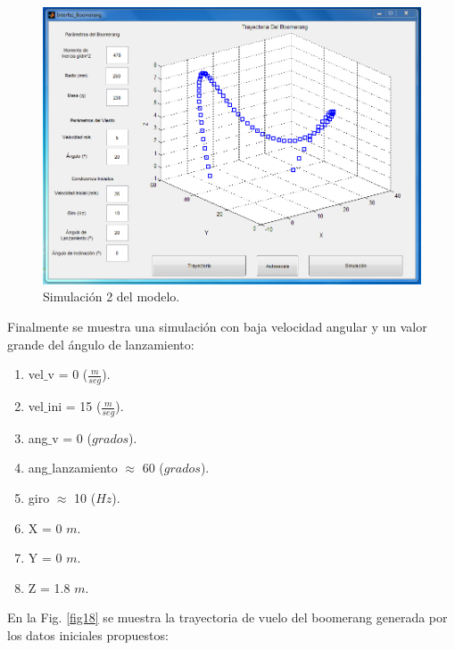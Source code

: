 		\begin{figure}[h]
		\begin{center}
		\includegraphics[scale=0.45]{imagenes/3-boomerang/tray_2.png}
		\caption{Simulación 2 del modelo.}
		\label{fig17}
		\end{center}
		\end{figure}

	Finalmente se muestra una simulación con baja velocidad angular y un valor grande del ángulo de lanzamiento:

		\begin{enumerate}
		\item{vel$\_$v = 0 {($\frac{m}{seg}$)}.}
		\item{vel$\_$ini = 15 {($\frac{m}{seg}$)}.}
		\item{ang$\_$v = 0 {($grados$)}.}
  		\item{ang$\_$lanzamiento $\approx$ 60 {($grados$)}.}
		\item{giro $\approx$ 10 {($Hz$)}.}
     	\item{X = 0 $m$.}
     	\item{Y = 0 $m$.}
     	\item{Z = 1.8 $m$.}
		\end{enumerate}

	En la Fig. \ref{fig18} se muestra la trayectoria de vuelo del boomerang generada por los datos iniciales propuestos:

